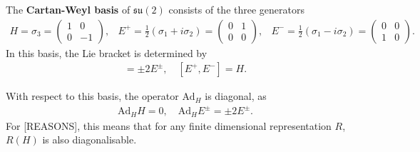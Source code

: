 \documentclass[11pt,fleqn]{article}
\begin{document}
\begin{definition}
	The \textbf{Cartan-Weyl basis} of $\mathfrak{su}(2)$ consists of the three generators
		\begin{subequations}
			\begin{align}
				H = \sigma_3 = \begin{pmatrix}
					1 & 0 \\ 0 & -1
				\end{pmatrix},
			\end{align}
			
			\begin{align}
				E^+ = \tfrac{1}{2}\left( \sigma_1 + i \sigma_2 \right)
					= \begin{pmatrix}
						0 & 1 \\ 0 & 0
					\end{pmatrix},
			\end{align}
			
			\begin{align}
				E^- = \tfrac{1}{2} \left( \sigma_1 - i \sigma_2 \right)
					= \begin{pmatrix}
						0 & 0 \\ 1 & 0
					\end{pmatrix}.
			\end{align}
		\end{subequations}
	In this basis, the Lie bracket is determined by
		\begin{align}
			[H, E^\pm ] = \pm 2 E^\pm, \quad [E^+,E^-] = H.
		\end{align}
\end{definition}
\begin{remark}
	With respect to this basis, the operator $\text{Ad}_H$ is diagonal, as
		\begin{align}
			\text{Ad}_H H = 0, \quad \text{Ad}_H E^\pm = \pm 2 E^\pm.
		\end{align}
	For [REASONS], this means that for any finite dimensional representation $R$, $R(H)$ is also diagonalisable.
\end{remark}
\end{document}
